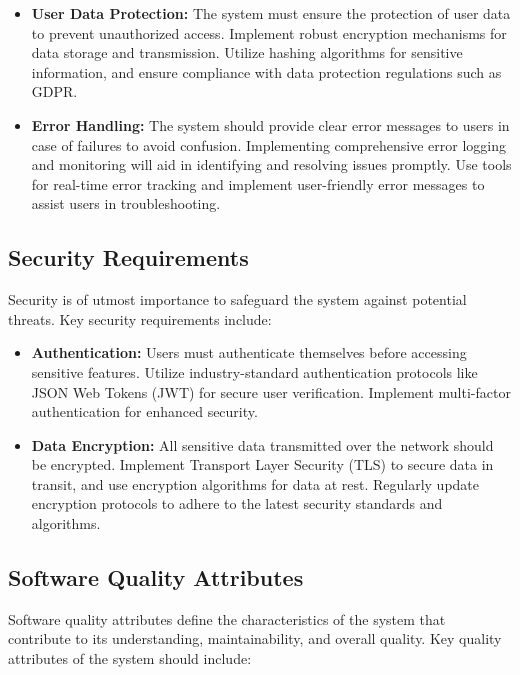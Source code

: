 \documentclass{article}
\begin{document}
\begin{itemize}
    \item \textbf{User Data Protection:} The system must ensure the protection of user data to prevent unauthorized access. Implement robust encryption mechanisms for data storage and transmission. Utilize hashing algorithms for sensitive information, and ensure compliance with data protection regulations such as GDPR.

    \item \textbf{Error Handling:} The system should provide clear error messages to users in case of failures to avoid confusion. Implementing comprehensive error logging and monitoring will aid in identifying and resolving issues promptly. Use tools for real-time error tracking and implement user-friendly error messages to assist users in troubleshooting.
\end{itemize}

\vspace{1em}  %

\subsection{Security Requirements}
Security is of utmost importance to safeguard the system against potential threats. Key security requirements include:

\vspace{1em}  %

\begin{itemize}
    \item \textbf{Authentication:} Users must authenticate themselves before accessing sensitive features. Utilize industry-standard authentication protocols like JSON Web Tokens (JWT) for secure user verification. Implement multi-factor authentication for enhanced security.

    \item \textbf{Data Encryption:} All sensitive data transmitted over the network should be encrypted. Implement Transport Layer Security (TLS) to secure data in transit, and use encryption algorithms for data at rest. Regularly update encryption protocols to adhere to the latest security standards and algorithms.
\end{itemize}

\subsection{Software Quality Attributes}
Software quality attributes define the characteristics of the system that contribute to its understanding, maintainability, and overall quality. Key quality attributes of the system should include:
\end{document}
